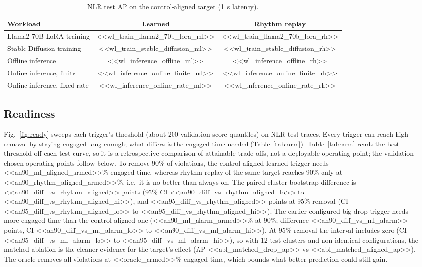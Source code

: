 \documentclass[conference]{IEEEtran}
\begin{document}
\begin{table}[t]
\centering
\caption{NLR test AP on the control-aligned target (1~s latency).}
\label{tab:wl}
\begin{tabular}{lcc}
\toprule
Workload & Learned & Rhythm replay\\
\midrule
Llama2-70B LoRA training & <<wl_train_llama2_70b_lora_ml>> & <<wl_train_llama2_70b_lora_rh>>\\
Stable Diffusion training & <<wl_train_stable_diffusion_ml>> & <<wl_train_stable_diffusion_rh>>\\
Offline inference & <<wl_inference_offline_ml>> & <<wl_inference_offline_rh>>\\
Online inference, finite & <<wl_inference_online_finite_ml>> & <<wl_inference_online_finite_rh>>\\
Online inference, fixed rate & <<wl_inference_online_rate_ml>> & <<wl_inference_online_rate_rh>>\\
\bottomrule
\end{tabular}
\end{table}

\subsection{Readiness}
Fig.~\ref{fig:ready} sweeps each trigger's threshold (about 200 validation-score quantiles) on NLR test
traces. Every trigger can reach high removal by staying engaged long enough; what differs is the engaged
time needed (Table~\ref{tab:arm}). Table~\ref{tab:arm} reads the best threshold off each test curve, so
it is a retrospective comparison of attainable trade-offs, not a deployable operating point; the
validation-chosen operating points follow below.
To remove 90\% of violations, the control-aligned learned trigger needs <<an90_ml_aligned_armed>>\%
engaged time, whereas rhythm replay of the same target reaches 90\% only at <<an90_rhythm_aligned_armed>>\%,
i.e.\ it is no better than always-on. The paired cluster-bootstrap difference is
<<an90_diff_vs_rhythm_aligned>> points (95\% CI <<an90_diff_vs_rhythm_aligned_lo>> to
<<an90_diff_vs_rhythm_aligned_hi>>), and <<an95_diff_vs_rhythm_aligned>> points at 95\% removal (CI
<<an95_diff_vs_rhythm_aligned_lo>> to <<an95_diff_vs_rhythm_aligned_hi>>). The earlier configured big-drop trigger
needs more engaged time than the control-aligned one (<<an90_ml_alarm_armed>>\% at 90\%; difference
<<an90_diff_vs_ml_alarm>> points, CI <<an90_diff_vs_ml_alarm_lo>> to <<an90_diff_vs_ml_alarm_hi>>). At 95\%
removal the interval includes zero (CI <<an95_diff_vs_ml_alarm_lo>> to <<an95_diff_vs_ml_alarm_hi>>), so with
12 test clusters and non-identical configurations, the matched ablation is the cleaner evidence for the
target's effect (AP <<abl_matched_drop_ap>> vs <<abl_matched_aligned_ap>>). The oracle removes all violations at <<oracle_armed>>\% engaged time, which bounds what
better prediction could still gain.
\end{document}
